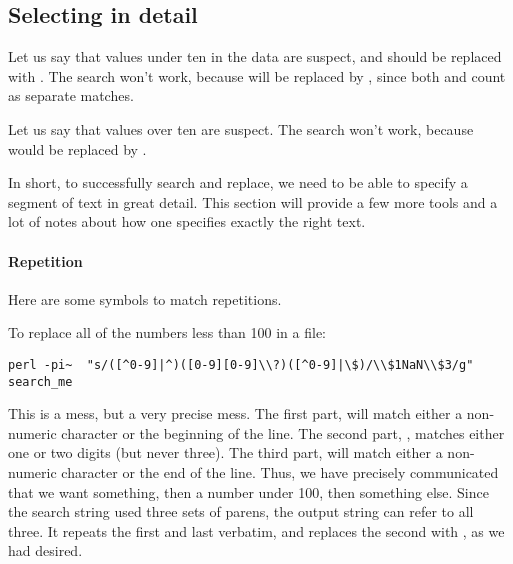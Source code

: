 \subsection{Selecting in detail}
Let us say that values under ten in the data are suspect, and should be
replaced with . The search  won't work,
because  will be replaced by , since both 
and  count as separate matches. 

Let us say that values over ten are suspect. The search
 won't work, because  would be replaced by
.

In short, to successfully search and replace, we need to be able to
specify a segment of text in great detail. This section will provide a
few more tools and a lot of notes about how one specifies exactly the
right text.

\paragraph{Repetition} 
Here are some symbols to match repetitions.
\begin{center}
\end{center}

To replace all of the numbers less than 100 in a file:
\begin{lstlisting}
perl -pi~  "s/([^0-9]|^)([0-9][0-9]\\?)([^0-9]|\$)/\\$1NaN\\$3/g" search_me
\end{lstlisting}
This is a mess, but a very precise mess. The first part,
\ci{([\that 0-9]|\that)} will match either a non-numeric character
or the beginning of the line. The second part,
,
matches either one or two digits (but never three). The third part, 
\ci{([\that0-9]|\$)} will match either a non-numeric character
or the end of the line. Thus, we have precisely communicated that we
want something, then a number under 100, then something else.
Since the search string used three sets of parens, the output string
can refer to all three. It repeats the first and last verbatim, and
replaces the second with , as we had desired.

